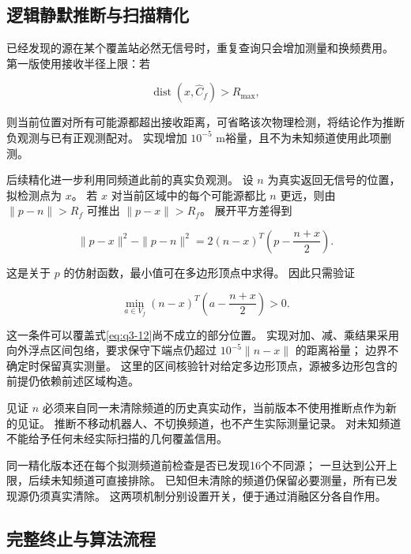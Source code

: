 \subsection{逻辑静默推断与扫描精化}\label{sec:q3-5}

已经发现的源在某个覆盖站必然无信号时，重复查询只会增加测量和换频费用。
第一版使用接收半径上限：若

\begin{equation}\label{eq:q3-12}
\operatorname{dist}(x,\widehat C_f)>R_{\max},
\end{equation}

则当前位置对所有可能源都超出接收距离，可省略该次物理检测，将结论作为推断负观测与已有正观测配对。
实现增加 \(10^{-5}\) m裕量，且不为未知频道使用此项删测。

后续精化进一步利用同频道此前的真实负观测。
设 \(n\) 为真实返回无信号的位置，拟检测点为 \(x\)。
若 \(x\) 对当前区域中的每个可能源都比 \(n\) 更远，则由 \(\|p-n\|>R_f\) 可推出 \(\|p-x\|>R_f\)。
展开平方差得到

\begin{equation}\label{eq:q3-13}
\|p-x\|^2-\|p-n\|^2
=2(n-x)^T\left(p-\frac{n+x}{2}\right).
\end{equation}

这是关于 \(p\) 的仿射函数，最小值可在多边形顶点中求得。
因此只需验证

\begin{equation}\label{eq:q3-14}
\min_{a\in V_f}(n-x)^T\left(a-\frac{n+x}{2}\right)>0.
\end{equation}

这一条件可以覆盖式\eqref{eq:q3-12}尚不成立的部分位置。
实现对加、减、乘结果采用向外浮点区间包络，要求保守下端点仍超过 \(10^{-5}\|n-x\|\) 的距离裕量；
边界不确定时保留真实测量。
这里的区间核验针对给定多边形顶点，源被多边形包含的前提仍依赖前述区域构造。

见证 \(n\) 必须来自同一未清除频道的历史真实动作，当前版本不使用推断点作为新的见证。
推断不移动机器人、不切换频道，也不产生实际测量记录。
对未知频道不能给予任何未经实际扫描的几何覆盖信用。

同一精化版本还在每个拟测频道前检查是否已发现16个不同源；
一旦达到公开上限，后续未知频道可直接排除。
已知但未清除的频道仍保留必要测量，所有已发现源仍须真实清除。
这两项机制分别设置开关，便于通过消融区分各自作用。

\subsection{完整终止与算法流程}\label{sec:q3-6}

